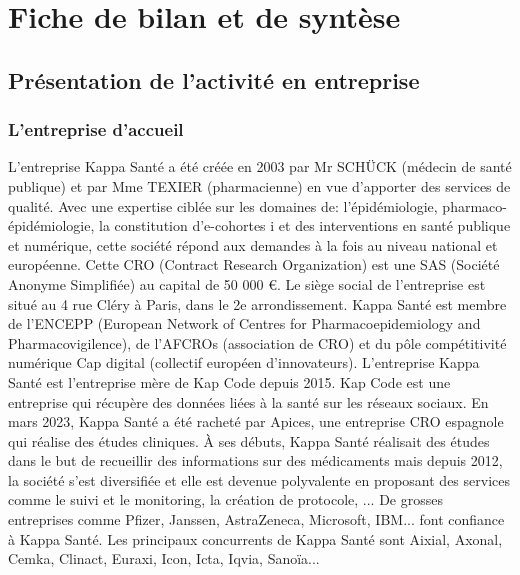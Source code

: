 \section{Fiche de bilan et de syntèse}
\subsection{Présentation de l'activité en entreprise}
\subsubsection{L'entreprise d'accueil}
L’entreprise Kappa Santé a été créée en 2003 par Mr SCHÜCK (médecin de
santé publique) et par Mme TEXIER (pharmacienne) en vue d’apporter des
services de qualité. Avec une expertise ciblée sur les domaines de:
l’épidémiologie, pharmaco- épidémiologie, la constitution d’e-cohortes i et des
interventions en santé publique et numérique, cette société répond aux
demandes à la fois au niveau national et européenne.
Cette CRO (Contract Research Organization) est une SAS (Société Anonyme
Simplifiée) au capital de 50 000 €.
Le siège social de l’entreprise est situé au 4 rue Cléry à Paris, dans le 2e
arrondissement.
Kappa Santé est membre de l’ENCEPP (European Network of Centres for
Pharmacoepidemiology and Pharmacovigilence), de l’AFCROs (association de
CRO) et du pôle compétitivité numérique Cap digital (collectif européen
d’innovateurs).
L’entreprise Kappa Santé est l’entreprise mère de Kap Code depuis 2015. Kap
Code est une entreprise qui récupère des données liées à la santé sur les
réseaux sociaux.
En mars 2023, Kappa Santé a été racheté par Apices, une entreprise CRO
espagnole qui réalise des études cliniques.
À ses débuts, Kappa Santé réalisait des études dans le but de recueillir des
informations sur des médicaments mais depuis 2012, la société s’est diversifiée
et elle est devenue polyvalente en proposant des services comme le suivi et le
monitoring, la création de protocole, ...
De grosses entreprises comme Pfizer, Janssen, AstraZeneca, Microsoft, IBM... font confiance à Kappa Santé. Les principaux concurrents de Kappa Santé sont
Aixial, Axonal, Cemka, Clinact, Euraxi, Icon, Icta, Iqvia, Sanoïa...

